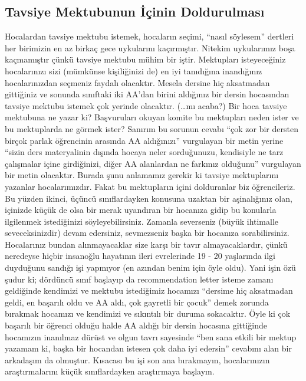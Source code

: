 \documentclass[12pt]{article}
\theoremstyle{break}
\begin{document}
\subsection{Tavsiye Mektubunun İçinin Doldurulması}
Hocalardan tavsiye mektubu istemek, hocaların seçimi, “nasıl söylesem” dertleri her birimizin en az birkaç gece uykularını kaçırmıştır. Nitekim uykularımız boşa kaçmamıştır çünkü tavsiye mektubu mühim bir iştir. Mektupları isteyeceğiniz hocalarınızı sizi (mümkünse kişiliğinizi de) en iyi tanıdığına inandığınız hocalarınızdan seçmeniz faydalı olacaktır. Mesela dersine hiç aksatmadan gittiğiniz ve sonunda sınıftaki iki AA’dan birini aldığınız bir dersin hocasından tavsiye mektubu istemek çok yerinde olacaktır. (…mı acaba?) Bir hoca tavsiye mektubuna ne yazar ki? Başvuruları okuyan komite bu mektupları neden ister ve bu mektuplarda ne görmek ister? Sanırım bu sorunun cevabı “çok zor bir dersten birçok parlak öğrencinin arasında AA aldığınızı” vurgulayan bir metin yerine “sizin ders materyalinin dışında hocaya neler sorduğunuzu, kendisiyle ne tarz çalışmalar içine girdiğinizi, diğer AA alanlardan ne farkınız olduğunu” vurgulayan bir metin olacaktır. Burada şunu anlamamız gerekir ki tavsiye mektuplarını yazanlar hocalarımızdır. Fakat bu mektupların içini dolduranlar biz öğrencileriz. Bu yüzden ikinci, üçüncü sınıflardayken konusuna uzaktan bir aşinalığınız olan, içinizde küçük de olsa bir merak uyandıran bir hocanıza gidip bu konularla ilgilenmek istediğinizi söyleyebilirsiniz. Zamanla severseniz (büyük ihtimalle seveceksinizdir) devam edersiniz, sevmezseniz başka bir hocanıza sorabilirsiniz. Hocalarınız bundan alınmayacaklar size karşı bir tavır almayacaklardır, çünkü neredeyse hiçbir insanoğlu hayatının ileri evrelerinde 19 - 20 yaşlarında ilgi duyduğunu sandığı işi yapmıyor (en azından benim için öyle oldu). Yani işin özü şudur ki; dördüncü sınıf başlayıp da recommendation letter isteme zamanı geldiğinde kendimizi ve mektubu istediğimiz hocamızı “dersime hiç aksatmadan geldi, en başarılı oldu ve AA aldı, çok gayretli bir çocuk” demek zorunda bırakmak hocamızı ve kendimizi ve sıkıntılı bir duruma sokacaktır. Öyle ki çok başarılı bir öğrenci olduğu halde AA aldığı bir dersin hocasına gittiğinde hocamızın inanılmaz dürüst ve olgun tavrı sayesinde “ben sana etkili bir mektup yazamam ki, başka bir hocandan istesen çok daha iyi edersin” cevabını alan bir arkadaşım da olmuştur. Kısacası bu işi son ana bırakmayın, hocalarınızın araştırmalarını küçük sınıflardayken araştırmaya başlayın.
\end{document}
